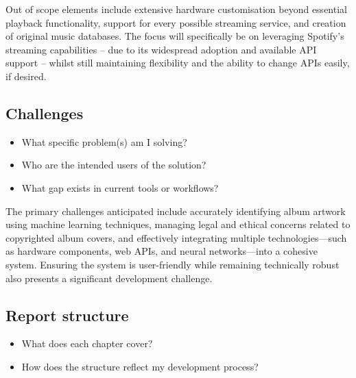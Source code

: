             Out of scope elements include extensive hardware customisation beyond essential playback functionality, support for every possible streaming service, and creation of original music databases. The focus will specifically be on leveraging Spotify's streaming capabilities -- due to its widespread adoption and available API support -- whilst still maintaining flexibility and the ability to change APIs easily, if desired.
        
        \subsection{Challenges}
    
            \begin{temp}
                \begin{itemize}
                    \item What specific problem(s) am I solving?
                    \item Who are the intended users of the solution?
                    \item What gap exists in current tools or workflows?
                \end{itemize}
            \end{temp}
    
            The primary challenges anticipated include accurately identifying album artwork using machine learning techniques, managing legal and ethical concerns related to copyrighted album covers, and effectively integrating multiple technologies—such as hardware components, web APIs, and neural networks—into a cohesive system. Ensuring the system is user-friendly while remaining technically robust also presents a significant development challenge.
        
        \subsection{Report structure} %
    
            \begin{temp}
                \begin{itemize}
                    \item What does each chapter cover?
                    \item How does the structure reflect my development process?
                \end{itemize}
            \end{temp}
        
